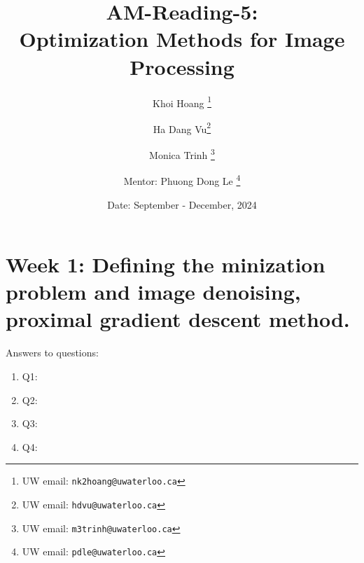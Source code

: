 \documentclass[a4paper]{article}
\begin{document}
\title{ AM-Reading-5: \\  Optimization Methods for Image Processing}

\author{Khoi Hoang %
  \thanks{UW email: \texttt{nk2hoang@uwaterloo.ca}} \and Ha Dang Vu\thanks{UW email: \texttt{hdvu@uwaterloo.ca}}   \and Monica Trinh \thanks{UW email: \texttt{m3trinh@uwaterloo.ca}} }
\affil{}

\author{Mentor: Phuong Dong Le%
  \thanks{UW email: \texttt{pdle@uwaterloo.ca}}}

\date{Date: September - December, 2024}

\maketitle
\pagebreak
\section{Week 1: Defining the minization problem and image denoising, proximal gradient descent method.}

Answers to questions:
\begin{enumerate}
\item Q1: 
\item Q2:
\item Q3:
\item Q4:
\end{enumerate}
\end{document}
